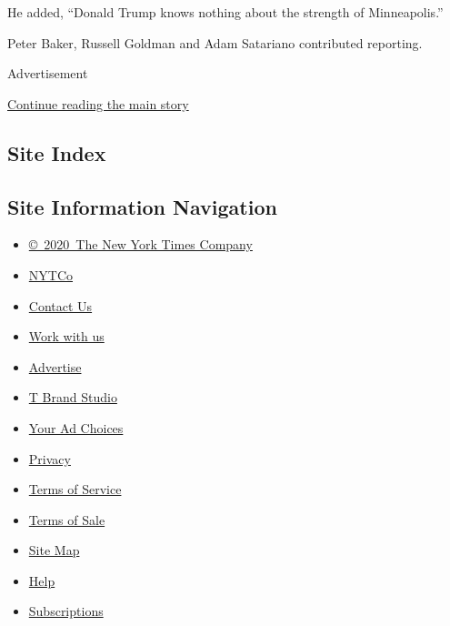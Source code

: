 He added, ``Donald Trump knows nothing about the strength of
Minneapolis.''

Peter Baker, Russell Goldman and Adam Satariano contributed reporting.

Advertisement

\protect\hyperlink{after-bottom}{Continue reading the main story}

\hypertarget{site-index}{%
\subsection{Site Index}\label{site-index}}

\hypertarget{site-information-navigation}{%
\subsection{Site Information
Navigation}\label{site-information-navigation}}

\begin{itemize}
\tightlist
\item
  \href{https://help.nytimes.com/hc/en-us/articles/115014792127-Copyright-notice}{©~2020~The
  New York Times Company}
\end{itemize}

\begin{itemize}
\tightlist
\item
  \href{https://www.nytco.com/}{NYTCo}
\item
  \href{https://help.nytimes.com/hc/en-us/articles/115015385887-Contact-Us}{Contact
  Us}
\item
  \href{https://www.nytco.com/careers/}{Work with us}
\item
  \href{https://nytmediakit.com/}{Advertise}
\item
  \href{http://www.tbrandstudio.com/}{T Brand Studio}
\item
  \href{https://www.nytimes.com/privacy/cookie-policy\#how-do-i-manage-trackers}{Your
  Ad Choices}
\item
  \href{https://www.nytimes.com/privacy}{Privacy}
\item
  \href{https://help.nytimes.com/hc/en-us/articles/115014893428-Terms-of-service}{Terms
  of Service}
\item
  \href{https://help.nytimes.com/hc/en-us/articles/115014893968-Terms-of-sale}{Terms
  of Sale}
\item
  \href{https://spiderbites.nytimes.com}{Site Map}
\item
  \href{https://help.nytimes.com/hc/en-us}{Help}
\item
  \href{https://www.nytimes.com/subscription?campaignId=37WXW}{Subscriptions}
\end{itemize}
